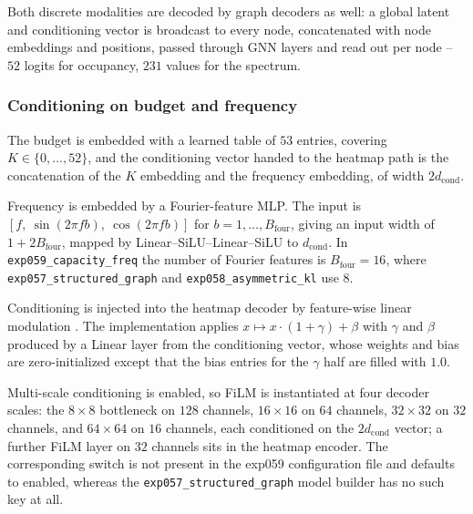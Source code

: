 Both discrete modalities are decoded by graph decoders as well: a global latent
and conditioning vector is broadcast to every node, concatenated with node
embeddings and positions, passed through GNN layers and read out per node --
$52$ logits for occupancy, $231$ values for the spectrum.

\subsubsection*{Conditioning on budget and frequency}

The budget is embedded with a learned table of $53$ entries, covering
$K \in \{0,\dots,52\}$, and the conditioning vector handed to the heatmap path is
the concatenation of the $K$ embedding and the frequency embedding, of width
$2 d_{\mathrm{cond}}$.

Frequency is embedded by a Fourier-feature MLP. The input is
$[f,\ \sin(2\pi f b),\ \cos(2\pi f b)]$ for $b = 1,\dots,B_{\mathrm{four}}$,
giving an input width of $1 + 2B_{\mathrm{four}}$, mapped by
Linear--SiLU--Linear--SiLU to $d_{\mathrm{cond}}$. In
\texttt{exp059\_capacity\_freq} the number of Fourier features is
$B_{\mathrm{four}} = 16$, where \texttt{exp057\_structured\_graph} and
\texttt{exp058\_asymmetric\_kl} use $8$.

Conditioning is injected into the heatmap decoder by feature-wise linear
modulation \cite{perez2018film}. The implementation applies
$x \mapsto x \cdot (1 + \gamma) + \beta$ with $\gamma$ and $\beta$ produced by a
Linear layer from the conditioning vector, whose weights and bias are
zero-initialized except that the bias entries for the $\gamma$ half are filled
with $1.0$.

Multi-scale conditioning is enabled, so FiLM is instantiated at four decoder
scales: the $8\times8$ bottleneck on $128$ channels, $16\times16$ on $64$
channels, $32\times32$ on $32$ channels, and $64\times64$ on $16$ channels, each
conditioned on the $2 d_{\mathrm{cond}}$ vector; a further FiLM layer on $32$
channels sits in the heatmap encoder. The corresponding switch is not present in
the exp059 configuration file and defaults to enabled, whereas the
\texttt{exp057\_structured\_graph} model builder has no such key at all.

